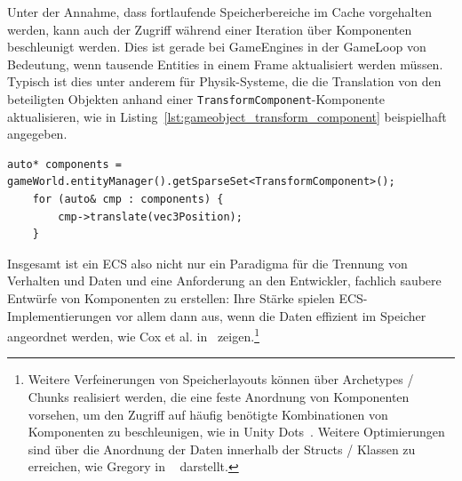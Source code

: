 Unter der Annahme, dass fortlaufende Speicherbereiche im Cache vorgehalten werden, kann auch der Zugriff während einer Iteration über Komponenten beschleunigt werden.
Dies ist gerade bei GameEngines in der GameLoop von Bedeutung, wenn tausende Entities in einem Frame aktualisiert werden müssen.
Typisch ist dies unter anderem für Physik-Systeme, die die Translation von den beteiligten Objekten anhand einer \texttt{TransformComponent}-Komponente aktualisieren, wie in Listing~\ref{lst:gameobject_transform_component} beispielhaft angegeben.

\begin{lstlisting}[style=c++style,
    caption={Codebeispiel ecs Sparse set},
    label=lst:gameobject_transform_component]
    auto* components = gameWorld.entityManager().getSparseSet<TransformComponent>();
    for (auto& cmp : components) {
        cmp->translate(vec3Position);
    }
\end{lstlisting}

Insgesamt ist ein ECS also nicht nur ein Paradigma für die Trennung von Verhalten und Daten und eine Anforderung an den Entwickler, fachlich saubere Entwürfe von Komponenten zu erstellen: Ihre Stärke spielen ECS-Implementierungen vor allem dann aus, wenn die Daten effizient im Speicher angeordnet werden, wie Cox et al. in~\cite{CWVW+25} zeigen.\footnote{
Weitere Verfeinerungen von Speicherlayouts können über Archetypes / Chunks realisiert werden, die eine feste Anordnung von Komponenten vorsehen, um den Zugriff auf häufig benötigte Kombinationen von Komponenten zu beschleunigen, wie in Unity Dots~\cite{UnityChunks}.
Weitere Optimierungen sind über die Anordnung der Daten innerhalb der Structs / Klassen zu erreichen, wie Gregory in ~\cite[159-161]{Gre19} darstellt.
}


